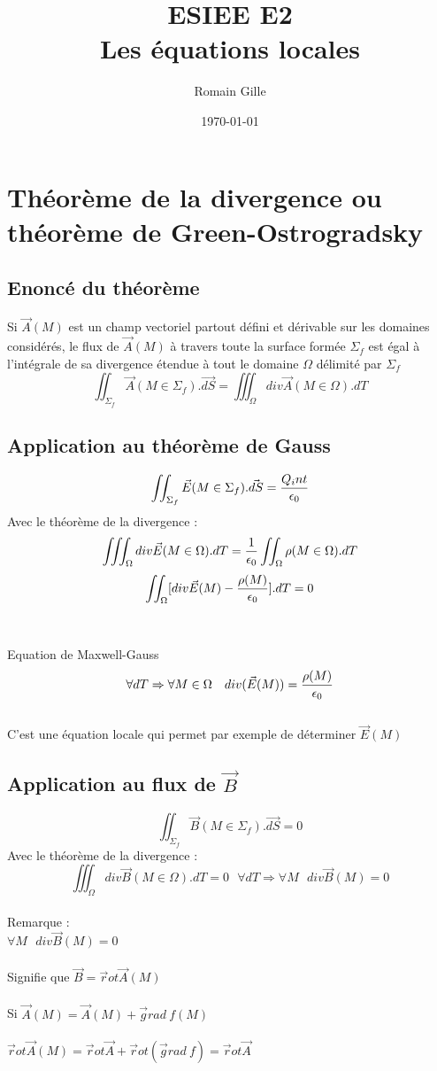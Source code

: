 \documentclass[11pt]{article}
\title{ESIEE E2 \\Les équations locales}
\author{Romain Gille}
\date{\today}
\begin{document}
\maketitle
\newpage
\section{Théorème de la divergence ou théorème de Green-Ostrogradsky}
\subsection{Enoncé du théorème}
Si $\vec{A}(M)$ est un champ vectoriel partout défini et dérivable sur les domaines considérés, le flux de $\vec{A}(M)$ à travers toute la surface formée $\Sigma_f$ est égal à l'intégrale de sa divergence étendue à tout le domaine $\Omega$ délimité par $\Sigma_f$
$$ \iint_{\Sigma_f}{\vec{A}(M \in \Sigma_f)}.\vec{dS} = \iiint_{\Omega}{div \vec{A}(M \in \Omega)}.dT$$
\subsection{Application au théorème de Gauss}
$$\iint_{\Sigma_f}{\vec{E}(M \in \Sigma_f)}.\vec{dS} = {{Q_int} \over {\epsilon_0}}$$
Avec le théorème de la divergence : 
$$\iiint_{\Omega}{div \vec{E}(M \in \Omega)}.dT = { 1 \over \epsilon_0} \iint_\Omega \rho(M \in \Omega).dT$$
$$\iint_{\Omega}[ div \vec E(M) - {\rho(M) \over \epsilon_0} ].dT = 0$$ \\
\\
Equation de Maxwell-Gauss
$$\forall dT \Rightarrow \forall M \in \Omega ~~~ div(\vec{E}(M)) = {\rho (M) \over \epsilon_0}$$
\\
C'est une équation locale qui permet par exemple de déterminer $\vec{E}(M)$
\newpage
\subsection{Application au flux de $\vec B$}
$$\iint_{\Sigma_f}{\vec{B}(M \in \Sigma_f)}.\vec{dS} = 0$$
Avec le théorème de la divergence : 
$$\iiint_{\Omega}{div \vec{B}(M \in \Omega)}.dT = 0 ~~~ \forall dT \Rightarrow \forall M ~~~ div \vec{B}(M) = 0$$
\\
Remarque : \\
$\forall M ~~~ div\vec{B}(M) = 0$ \\
\\
Signifie que $\vec B = \vec rot \vec A(M)$ \\
\\
Si $\vec A(M) = \vec A(M) + \vec grad ~ f(M)$ \\
\\
$\vec rot \vec A(M) = \vec rot \vec A + \vec rot(\vec grad ~ f) = \vec rot \vec A$
\end{document}
